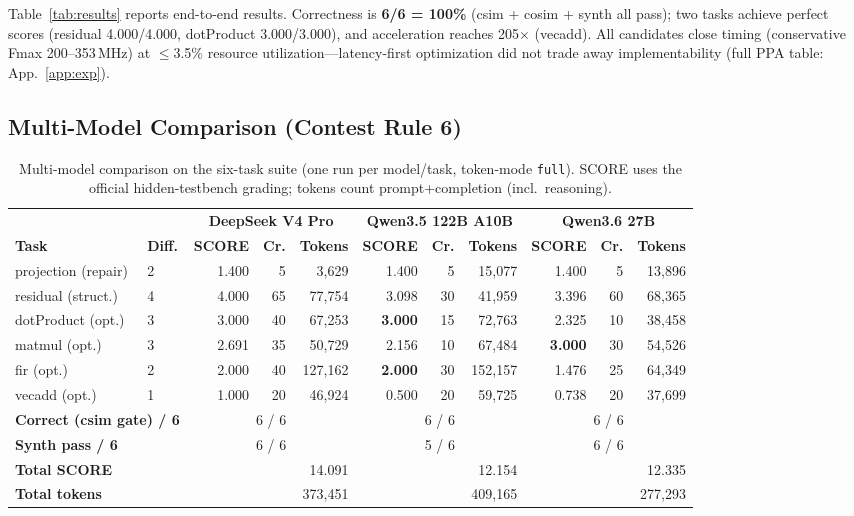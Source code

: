 \documentclass[10pt,conference,letterpaper]{IEEEtran}
\begin{document}
Table~\ref{tab:results} reports end-to-end results. Correctness is \textbf{6/6 = 100\%} (csim + cosim + synth all pass); two tasks achieve perfect scores (residual 4.000/4.000, dotProduct 3.000/3.000), and acceleration reaches 205$\times$ (vecadd). All candidates close timing (conservative Fmax 200--353\,MHz) at $\leq$3.5\% resource utilization---latency-first optimization did not trade away implementability (full PPA table: App.~\ref{app:exp}).

\subsection{Multi-Model Comparison (Contest Rule 6)}
\label{sec:multimodel}

\begin{table}[t]
\centering
\caption{Multi-model comparison on the six-task suite (one run per model/task, token-mode \texttt{full}). SCORE uses the official hidden-testbench grading; tokens count prompt+completion (incl.\ reasoning).}
\label{tab:multimodel}
\footnotesize
\begin{tabular}{ll rrr rrr rrr}
\toprule
& & \multicolumn{3}{c}{\textbf{DeepSeek V4 Pro}} & \multicolumn{3}{c}{\textbf{Qwen3.5 122B A10B}} & \multicolumn{3}{c}{\textbf{Qwen3.6 27B}} \\
\cmidrule(lr){3-5} \cmidrule(lr){6-8} \cmidrule(lr){9-11}
\textbf{Task} & \textbf{Diff.} & \textbf{SCORE} & \textbf{Cr.} & \textbf{Tokens} & \textbf{SCORE} & \textbf{Cr.} & \textbf{Tokens} & \textbf{SCORE} & \textbf{Cr.} & \textbf{Tokens} \\
\midrule
projection (repair) & 2 & 1.400 & 5 & 3,629 & 1.400 & 5 & 15,077 & 1.400 & 5 & 13,896 \\
residual (struct.) & 4 & 4.000 & 65 & 77,754 & 3.098 & 30 & 41,959 & 3.396 & 60 & 68,365 \\
dotProduct (opt.) & 3 & 3.000 & 40 & 67,253 & \textbf{3.000} & 15 & 72,763 & 2.325 & 10 & 38,458 \\
matmul (opt.) & 3 & 2.691 & 35 & 50,729 & 2.156 & 10 & 67,484 & \textbf{3.000} & 30 & 54,526 \\
fir (opt.) & 2 & 2.000 & 40 & 127,162 & \textbf{2.000} & 30 & 152,157 & 1.476 & 25 & 64,349 \\
vecadd (opt.) & 1 & 1.000 & 20 & 46,924 & 0.500 & 20 & 59,725 & 0.738 & 20 & 37,699 \\
\midrule
\multicolumn{2}{l}{\textbf{Correct (csim gate) / 6}} & \multicolumn{3}{c}{6 / 6} & \multicolumn{3}{c}{6 / 6} & \multicolumn{3}{c}{6 / 6} \\
\multicolumn{2}{l}{\textbf{Synth pass / 6}} & \multicolumn{3}{c}{6 / 6} & \multicolumn{3}{c}{5 / 6} & \multicolumn{3}{c}{6 / 6} \\
\multicolumn{2}{l}{\textbf{Total SCORE}} & \multicolumn{3}{r}{14.091} & \multicolumn{3}{r}{12.154} & \multicolumn{3}{r}{12.335} \\
\multicolumn{2}{l}{\textbf{Total tokens}} & \multicolumn{3}{r}{373,451} & \multicolumn{3}{r}{409,165} & \multicolumn{3}{r}{277,293} \\
\bottomrule
\end{tabular}
\end{table}
\end{document}
